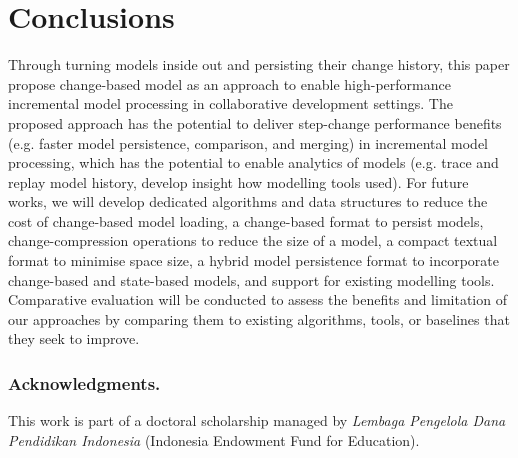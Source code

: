 \documentclass{llncs}
\begin{document}
\section{Conclusions}
\label{Conclusions}
Through turning models inside out and persisting their change history, this paper propose change-based model as an approach to enable high-performance incremental model processing in collaborative development settings. The proposed approach has the potential to deliver step-change performance benefits (e.g. faster model persistence, comparison, and merging) in incremental model processing, which has the potential to enable analytics of models (e.g. trace and replay model history, develop insight how modelling tools used). For future works, we will develop dedicated algorithms and data structures to reduce the cost of change-based model loading, a change-based format to persist models, change-compression operations to reduce the size of a model, a compact textual format to minimise space size, a hybrid model persistence format to incorporate change-based and state-based models, and support for existing modelling tools. Comparative evaluation will be conducted to assess the benefits and limitation of our approaches by comparing them to existing algorithms, tools, or baselines that they seek to improve.

\subsubsection*{Acknowledgments.} This work is part of a doctoral scholarship managed by \emph{Lembaga Pengelola Dana Pendidikan Indonesia} (Indonesia Endowment Fund for Education).

 

\end{document}
